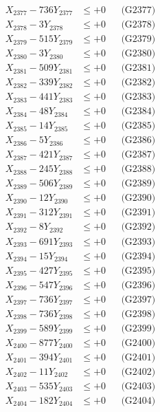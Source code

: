 \documentclass[a4paper,10pt]{article}
\begin{document}
{\begin{align}
X_{2377} - 736Y_{2377} &\leq +0 && \text{(G2377)} \\
X_{2378} - 3Y_{2378} &\leq +0 && \text{(G2378)} \\
X_{2379} - 515Y_{2379} &\leq +0 && \text{(G2379)} \\
X_{2380} - 3Y_{2380} &\leq +0 && \text{(G2380)} \\
\allowbreak
X_{2381} - 509Y_{2381} &\leq +0 && \text{(G2381)} \\
X_{2382} - 339Y_{2382} &\leq +0 && \text{(G2382)} \\
X_{2383} - 441Y_{2383} &\leq +0 && \text{(G2383)} \\
X_{2384} - 48Y_{2384} &\leq +0 && \text{(G2384)} \\
X_{2385} - 14Y_{2385} &\leq +0 && \text{(G2385)} \\
X_{2386} - 5Y_{2386} &\leq +0 && \text{(G2386)} \\
X_{2387} - 421Y_{2387} &\leq +0 && \text{(G2387)} \\
X_{2388} - 245Y_{2388} &\leq +0 && \text{(G2388)} \\
X_{2389} - 506Y_{2389} &\leq +0 && \text{(G2389)} \\
X_{2390} - 12Y_{2390} &\leq +0 && \text{(G2390)} \\
\allowbreak
X_{2391} - 312Y_{2391} &\leq +0 && \text{(G2391)} \\
X_{2392} - 8Y_{2392} &\leq +0 && \text{(G2392)} \\
X_{2393} - 691Y_{2393} &\leq +0 && \text{(G2393)} \\
X_{2394} - 15Y_{2394} &\leq +0 && \text{(G2394)} \\
X_{2395} - 427Y_{2395} &\leq +0 && \text{(G2395)} \\
X_{2396} - 547Y_{2396} &\leq +0 && \text{(G2396)} \\
X_{2397} - 736Y_{2397} &\leq +0 && \text{(G2397)} \\
X_{2398} - 736Y_{2398} &\leq +0 && \text{(G2398)} \\
X_{2399} - 589Y_{2399} &\leq +0 && \text{(G2399)} \\
X_{2400} - 877Y_{2400} &\leq +0 && \text{(G2400)} \\
\allowbreak
X_{2401} - 394Y_{2401} &\leq +0 && \text{(G2401)} \\
X_{2402} - 11Y_{2402} &\leq +0 && \text{(G2402)} \\
X_{2403} - 535Y_{2403} &\leq +0 && \text{(G2403)} \\
X_{2404} - 182Y_{2404} &\leq +0 && \text{(G2404)} \\

\end{align}}
\end{document}
